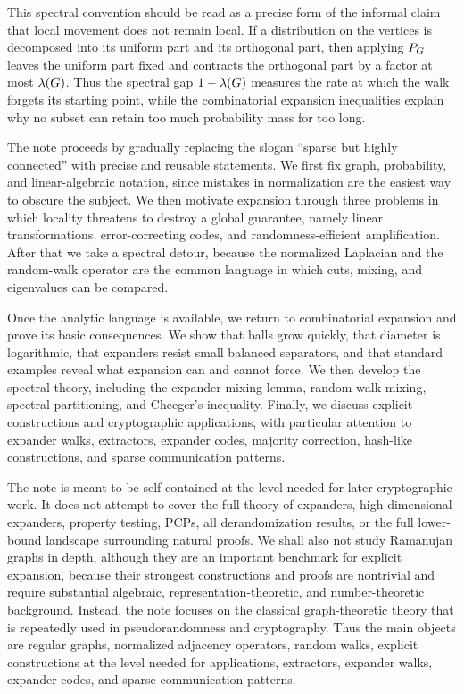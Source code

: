 This spectral convention should be read as a precise form of the informal claim that local movement does not remain local. If a distribution on the vertices is decomposed into its uniform part and its orthogonal part, then applying \(P_{G}\) leaves the uniform part fixed and contracts the orthogonal part by a factor at most \(\lambda(G)\). Thus the spectral gap \(1-\lambda(G)\) measures the rate at which the walk forgets its starting point, while the combinatorial expansion inequalities explain why no subset can retain too much probability mass for too long.

 The note proceeds by gradually replacing the slogan ``sparse but highly connected'' with precise and reusable statements. We first fix graph, probability, and linear-algebraic notation, since mistakes in normalization are the easiest way to obscure the subject. We then motivate expansion through three problems in which locality threatens to destroy a global guarantee, namely linear transformations, error-correcting codes, and randomness-efficient amplification. After that we take a spectral detour, because the normalized Laplacian and the random-walk operator are the common language in which cuts, mixing, and eigenvalues can be compared.

Once the analytic language is available, we return to combinatorial expansion and prove its basic consequences. We show that balls grow quickly, that diameter is logarithmic, that expanders resist small balanced separators, and that standard examples reveal what expansion can and cannot force. We then develop the spectral theory, including the expander mixing lemma, random-walk mixing, spectral partitioning, and Cheeger's inequality. Finally, we discuss explicit constructions and cryptographic applications, with particular attention to expander walks, extractors, expander codes, majority correction, hash-like constructions, and sparse communication patterns.

 The note is meant to be self-contained at the level needed for later cryptographic work. It does not attempt to cover the full theory of expanders, high-dimensional expanders, property testing, PCPs, all derandomization results, or the full lower-bound landscape surrounding natural proofs. We shall also not study Ramanujan graphs in depth, although they are an important benchmark for explicit expansion, because their strongest constructions and proofs are nontrivial and require substantial algebraic, representation-theoretic, and number-theoretic background. Instead, the note focuses on the classical graph-theoretic theory that is repeatedly used in pseudorandomness and cryptography. Thus the main objects are regular graphs, normalized adjacency operators, random walks, explicit constructions at the level needed for applications, extractors, expander walks, expander codes, and sparse communication patterns.

